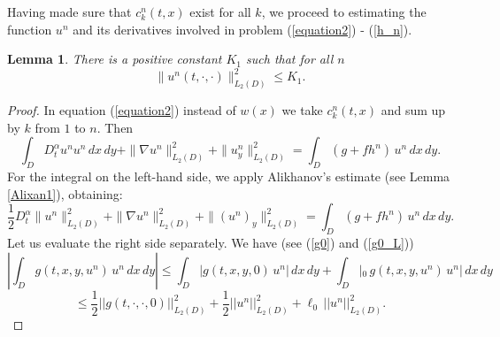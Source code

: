 \documentclass[12pt]{amsart}
\newtheorem{lem}[thm]{Lemma}
\theoremstyle{definition}
\numberwithin{equation}{section}
\begin{document}
Having made sure that $c_k^n(t, x)$ exist for all $k$, we proceed to estimating the function $u^n$ and its derivatives involved in problem (\ref{equation2}) - (\ref{h_n}).
\begin{lem}\label{un_estimateLemam} There is a positive constant $K_1$ such that for all $n$
\begin{equation}\label{un_estimate}
    \| u^n(t, \cdot, \cdot) \|_{L_2(D)}^2\leq K_1 .
\end{equation}
\end{lem}
\begin{proof}
In equation (\ref{equation2}) instead of $w(x)$ we take $c_k^n(t, x)$ and sum up by $k$ from $1$ to $n$. Then
\[
\int_D D_t^\alpha u^n u^n \, dx\, dy + \| \nabla u^n \|_{L_2(D)}^2 +  \| u^n_y \|_{L_2(D)}^2
= \int_D (g + f h^n)\, u^n\, dx\, dy.
\]
For the integral on the left-hand side, we apply Alikhanov’s estimate (see Lemma \ref{Alixan1}), obtaining:
\begin{equation}\label{Du^n}
\frac{1}{2} D_t^\alpha \| u^n \|_{L_2(D)}^2 + \| \nabla u^n \|_{L_2(D)}^2 +  \| (u^n)_y \|_{L_2(D)}^2
= \int_D (g + f h^n)\, u^n\, dx\, dy.
\end{equation} 
Let us evaluate the right side separately. We have (see (\ref{g0}) and (\ref{g0_L}))
\[
\left|\int_D g(t,x,y, u^n)\, u^n\, dx\, dy\right| \leq \int_D |g(t,x,y, 0)\, u^n|\, dx\, dy + \int_D |_0\, g(t,x,y, u^n)\, u^n|\, dx\, dy
\]
\begin{equation}\label{gu^n}
    \leq \frac{1}{2} ||g(t, \cdot, \cdot, 0)||_{L_2(D)}^2 + \frac{1}{2} ||u^n||_{L_2(D)}^2 + \ell_0 \,  ||u^n||_{L_2(D)}^2.
\end{equation}


\end{proof}
\end{document}
